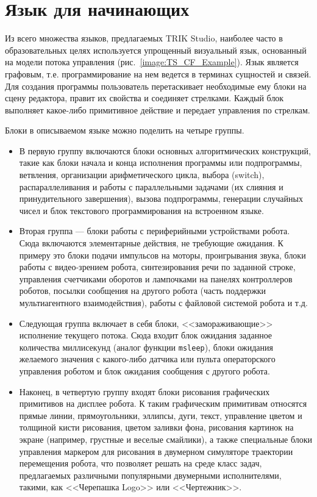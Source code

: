 \documentclass[a5paper]{article}
\begin{document}
\section{Язык для начинающих}
\label{chapter:controlFlowLanguage}

Из всего множества языков, предлагаемых TRIK Studio, наиболее часто в образовательных целях используется упрощенный визуальный язык, основанный на модели потока управления (рис.~\ref{image:TS_CF_Example}). Язык является графовым, т.е. программирование на нем ведется в терминах сущностей и связей. Для создания программы пользователь перетаскивает необходимые ему блоки на сцену редактора, правит их свойства и соединяет стрелками. Каждый блок выполняет какое-либо примитивное действие и передает управления по стрелкам.

Блоки в описываемом языке можно поделить на четыре группы. 
\begin{itemize}
    \item В первую группу включаются блоки основных алгоритмических конструкций, такие как блоки начала и конца исполнения программы или подпрограммы, ветвления, организации арифметического цикла, выбора (switch), распараллеливания и работы с параллельными задачами (их слияния и принудительного завершения), вызова подпрограммы, генерации случайных чисел и блок текстового программирования на встроенном языке.
    \item Вторая группа --- блоки работы с периферийными устройствами робота. Сюда включаются элементарные действия, не требующие ожидания. К примеру это блоки подачи импульсов на моторы, проигрывания звука, блоки работы с видео-зрением робота, синтезирования речи по заданной строке, управления счетчиками оборотов и лампочками на панелях контроллеров роботов, посылки сообщения на другого робота (часть поддержки мультиагентного взаимодействия), работы с файловой системой робота и т.д.
    \item Следующая группа включает в себя блоки, <<замораживающие>> исполнение текущего потока. Сюда входит блок ожидания заданное количества миллисекунд (аналог функции \texttt{msleep}), блоки ожидания желаемого значения с какого-либо датчика или пульта операторского управления роботом и блок ожидания сообщения с другого робота.
    \item Наконец, в четвертую группу входят блоки рисования графических примитивов на дисплее робота. К таким графическим примитивам относятся прямые линии, прямоугольники, эллипсы, дуги, текст, управление цветом и толщиной кисти рисования, цветом заливки фона, рисования картинок на экране (например, грустные и веселые смайлики), а также специальные блоки управления маркером для рисования в двумерном симуляторе траектории перемещения робота, что позволяет решать на среде класс задач, предлагаемых различными популярными двумерными исполнителями, такими, как <<Черепашка Logo>> или <<Чертежник>>.
\end{itemize}
\end{document}
